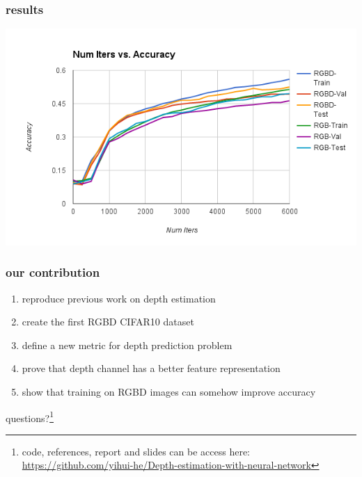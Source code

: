 \documentclass{beamer}
\begin{document}
\begin{frame}
\frametitle{results}
\includegraphics[width=\linewidth]{alexResult.png}
\end{frame}



\begin{frame}
\frametitle{our contribution}
\begin{enumerate}
\item reproduce previous work on depth estimation
\item create the first RGBD CIFAR10 dataset
\item define a new metric for depth prediction problem
\item prove that depth channel has a better feature representation 
\item show that training on RGBD images can somehow improve accuracy
\end{enumerate}
\end{frame}


\begin{frame}
\Huge{\centerline{questions?\footnote{code, references, report and slides can be access here:
\href{https://github.com/yihui-he/Depth-estimation-with-neural-network}{https://github.com/yihui-he/Depth-estimation-with-neural-network}}}}
\end{frame}
\end{document}
